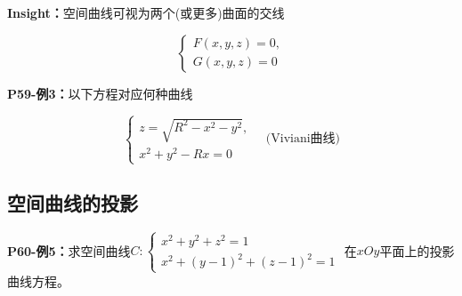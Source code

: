 {\bf Insight：}空间曲线可视为两个(或更多)曲面的交线

$${\left\{\begin{array}{l}
	F(x,y,z)=0,\\ G(x,y,z)=0
\end{array}\right.}$$

{\bf P59-例3：}以下方程对应何种曲线

$$\left\{\begin{array}{l}
	z=\sqrt{R^2-x^2-y^2},\\ x^2+y^2-Rx=0
\end{array}\right. \quad{\mbox{(Viviani曲线)}}$$

\begin{center}
\end{center}

\subsection{空间曲线的投影}

{\bf P60-例5：}求空间曲线$C:\left\{\begin{array}{l}
	x^2+y^2+z^2=1\\ x^2+(y-1)^2+(z-1)^2=1
\end{array}\right.$
在$xOy$平面上的投影曲线方程。

